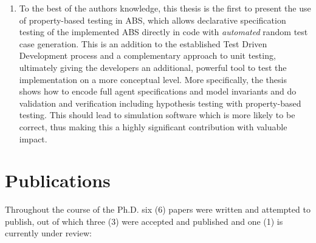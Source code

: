 \begin{enumerate}
	\item To the best of the authors knowledge, this thesis is the first to present the use of property-based testing in ABS, which allows declarative specification testing of the implemented ABS directly in code with \textit{automated} random test case generation. This is an addition to the established Test Driven Development process and a complementary approach to unit testing, ultimately giving the developers an additional, powerful tool to test the implementation on a more conceptual level. More specifically, the thesis shows how to encode full agent specifications and model invariants and do validation and verification including hypothesis testing with property-based testing. This should lead to simulation software which is more likely to be correct, thus making this a highly significant contribution with valuable impact.

\end{enumerate}

\section{Publications}
Throughout the course of the Ph.D. six (6) papers were written and attempted to publish, out of which three (3) were accepted and published and one (1) is currently under review:

